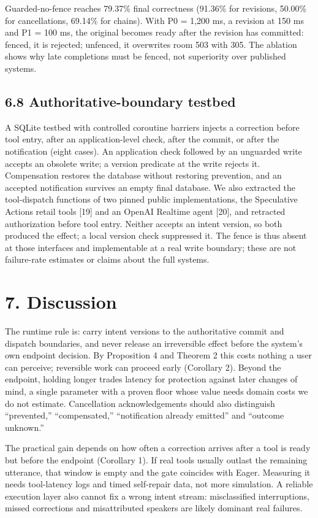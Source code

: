 \documentclass[review,12pt]{elsarticle}
\begin{document}
Guarded-no-fence reaches 79.37\% final correctness (91.36\% for revisions, 50.00\% for cancellations, 69.14\% for chains). With P0 = 1,200 ms, a revision at 150 ms and P1 = 100 ms, the original becomes ready after the revision has committed: fenced, it is rejected; unfenced, it overwrites room 503 with 305. The ablation shows why late completions must be fenced, not superiority over published systems.


\subsection*{6.8 Authoritative-boundary testbed}

A SQLite testbed with controlled coroutine barriers injects a correction before tool entry, after an application-level check, after the commit, or after the notification (eight cases). An application check followed by an unguarded write accepts an obsolete write; a version predicate at the write rejects it. Compensation restores the database without restoring prevention, and an accepted notification survives an empty final database. We also extracted the tool-dispatch functions of two pinned public implementations, the Speculative Actions retail tools [19] and an OpenAI Realtime agent [20], and retracted authorization before tool entry. Neither accepts an intent version, so both produced the effect; a local version check suppressed it. The fence is thus absent at those interfaces and implementable at a real write boundary; these are not failure-rate estimates or claims about the full systems.


\section*{7. Discussion}

The runtime rule is: carry intent versions to the authoritative commit and dispatch boundaries, and never release an irreversible effect before the system's own endpoint decision. By Proposition 4 and Theorem 2 this costs nothing a user can perceive; reversible work can proceed early (Corollary 2). Beyond the endpoint, holding longer trades latency for protection against later changes of mind, a single parameter with a proven floor whose value needs domain costs we do not estimate. Cancellation acknowledgements should also distinguish ``prevented,'' ``compensated,'' ``notification already emitted'' and ``outcome unknown.''


The practical gain depends on how often a correction arrives after a tool is ready but before the endpoint (Corollary 1). If real tools usually outlast the remaining utterance, that window is empty and the gate coincides with Eager. Measuring it needs tool-latency logs and timed self-repair data, not more simulation. A reliable execution layer also cannot fix a wrong intent stream: misclassified interruptions, missed corrections and misattributed speakers are likely dominant real failures.
\end{document}
